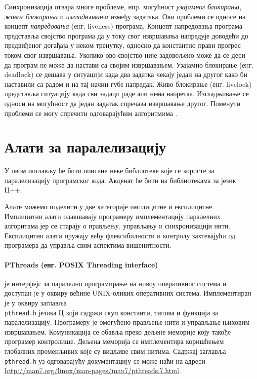 \documentclass[12pt,oneside]{memoir}
\begin{document}
 Синхронизација отвара многе проблеме, нпр. могућност \emph{узајамног блокирања}, \emph{живог блокирања} и \emph{изгладњивања} између задатака. Ови проблеми се односе на концепт \emph{напредовања} (енг. liveness) програма. Концепт напредовања програма представља својство програма да у току свог извршавања напредује доводећи до предвиђеног догађаја у неком тренутку, односно да константно прави прогрес током свог извршавања. Уколико ово својство није задовољено може да се деси да програм не може да настави са својим извршавањем. Узајамно блокирање (енг. deadlock) се дешава у ситуацији када два задатка чекају један на другог како би наставили са радом и на тај начин губе напредак. Живо блокирање (енг. livelock) представља ситуацију када сви задаци раде али нема напретка. Изгладњивање се односи на могућност да један задатак спречава извршавање другог. Поменути проблеми се могу спречити одговарајућим алгоритмима \cite{opsis}.


  \section{Алати за паралелизацију}
	У овом поглављу ће бити описане неке библиотеке које се користе за паралелизацију програмског кода. Акценат ће бити на библиотекама за језик Ц++. 
	
 Алате можемо поделити у две категорије имплицитне и експлицитне. Имплицитни алати олакшавају програмеру имплементацију паралелних алгоритама јер се старају о прављењу, управљању и синхронизацији нити. Експлицитни алати пружају већу флексибилности и контролу захтевајући од програмера да управља свим аспектима вишенитности.
	
\paragraph{ PThreads (енг. POSIX Threading interface)} је интерфејс за паралелно програмирање на нивоу оперативног система и доступан је у оквиру већине UNIX-оликих оперативних система. Имплементиран је у оквиру заглавља \\ \texttt{pthread.h} језика Ц који садржи скуп константи, типова и функција за паралелизацију. Програмеру је омогућено прављење нити и управљање њиховим извршавањем. Комуникација се обавља преко дељене меморије коју такође програмер контролише. Дељена меморија се имплементира коришћењем глобалних променљивих које су видљиве свим нитима. Садржај заглавља \texttt{pthread.h} уз одговарајућу документацију се може наћи на адреси \url{http://man7.org/linux/man-pages/man7/pthreads.7.html}.
\end{document}
